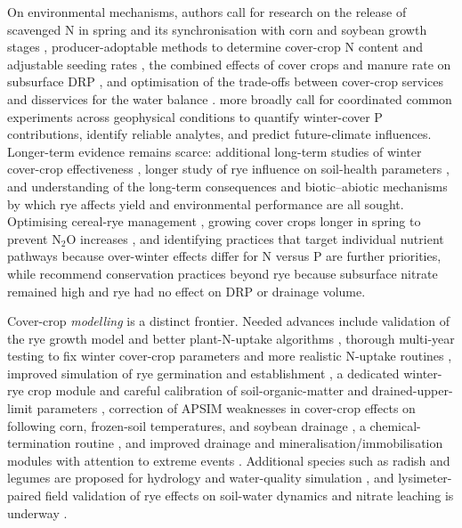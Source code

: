 \documentclass[11pt]{article}
\begin{document}
On environmental mechanisms, authors call for research on the release of scavenged N in spring and its synchronisation with corn and soybean growth stages \parencite{Lacey2015}, producer-adoptable methods to determine cover-crop N content and adjustable seeding rates \parencite{Roth2018}, the combined effects of cover crops and manure rate on subsurface DRP \parencite{Askar2023}, and optimisation of the trade-offs between cover-crop services and disservices for the water balance \parencite{Meyer2019}. \textcite{Liu2019} more broadly call for coordinated common experiments across geophysical conditions to quantify winter-cover P contributions, identify reliable analytes, and predict future-climate influences. Longer-term evidence remains scarce: additional long-term studies of winter cover-crop effectiveness \parencite{Kaspar2012}, longer study of rye influence on soil-health parameters \parencite{Bawa2023}, and understanding of the long-term consequences and biotic--abiotic mechanisms by which rye affects yield and environmental performance \parencite{MartinezFeria2016} are all sought. Optimising cereal-rye management \parencite{deOliveira2022}, growing cover crops longer in spring to prevent N$_2$O increases \parencite{PrezaFontes2023}, and identifying practices that target individual nutrient pathways because over-winter effects differ for N versus P \parencite{McNeill2026} are further priorities, while \textcite{Krueger2013} recommend conservation practices beyond rye because subsurface nitrate remained high and rye had no effect on DRP or drainage volume.

Cover-crop \emph{modelling} is a distinct frontier. Needed advances include validation of the rye growth model and better plant-N-uptake algorithms \parencite{Feyereisen2006}, thorough multi-year testing to fix winter cover-crop parameters and more realistic N-uptake routines \parencite{Malone2007c}, improved simulation of rye germination and establishment \parencite{Malone2014b}, a dedicated winter-rye crop module and careful calibration of soil-organic-matter and drained-upper-limit parameters \parencite{Chatterjee2025}, correction of APSIM weaknesses in cover-crop effects on following corn, frozen-soil temperatures, and soybean drainage \parencite{Dietzel2016}, a chemical-termination routine \parencite{Gupta2022}, and improved drainage and mineralisation/immobilisation modules with attention to extreme events \parencite{Gupta2023b}. Additional species such as radish and legumes are proposed for hydrology and water-quality simulation \parencite{Singh2023}, and lysimeter-paired field validation of rye effects on soil-water dynamics and nitrate leaching is underway \parencite{Qi2010b}.
\end{document}
